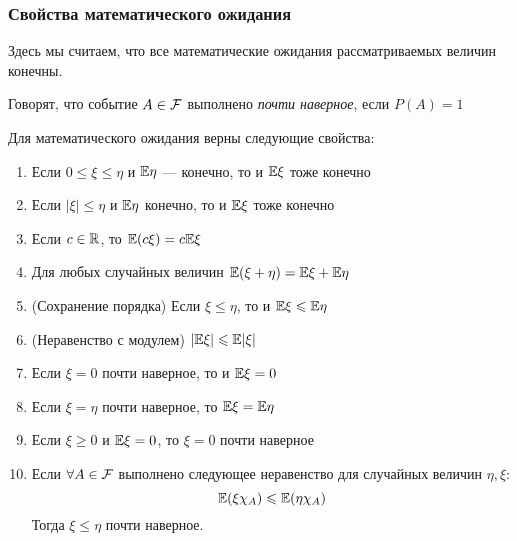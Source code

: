 \subsubsection*{Свойства математического ожидания}

\begin{note}
	Здесь мы считаем, что все математические ожидания рассматриваемых величин конечны.
\end{note}

\begin{definition}
	Говорят, что событие $A \in \mathcal{F}$ выполнено \textit{почти наверное}, если $P(A) = 1$
\end{definition}

\begin{proposition}
	Для математического ожидания верны следующие свойства:
	\begin{enumerate}
		\item Если $0 \le \xi \le \eta$ и $\mathbb{E}\eta$ --- конечно, то и $\mathbb{E}\xi$ тоже конечно
		
		\item Если $|\xi| \le \eta$ и $\mathbb{E}\eta$ конечно, то и $\mathbb{E}\xi$ тоже конечно
		
		\item Если $c \in \mathbb{R}$, то $\mathbb{E}(c\xi) = c\mathbb{E}\xi$
		
		\item Для любых случайных величин $\mathbb{E}(\xi + \eta) = \mathbb{E}\xi + \mathbb{E}\eta$
		
		\item (Сохранение порядка) Если $\xi \le \eta$, то и $\mathbb{E}\xi \leqslant \mathbb{E}\eta$
		
		\item (Неравенство с модулем) $|\mathbb{E}\xi| \leqslant \mathbb{E}|\xi|$
		
		\item Если $\xi = 0$ почти наверное, то и $\mathbb{E}\xi = 0$
		
		\item Если $\xi = \eta$ почти наверное, то $\mathbb{E}\xi = \mathbb{E}\eta$
		
		\item Если $\xi \ge 0$ и $\mathbb{E}\xi = 0$, то $\xi = 0$ почти наверное
		
		\item Если $\forall A \in \mathcal{F}$ выполнено следующее неравенство для случайных величин $\eta, \xi$:
		\[
			\mathbb{E}(\xi\chi_A) \leqslant \mathbb{E}(\eta\chi_A)
		\]
		Тогда $\xi \le \eta$ почти наверное.
	\end{enumerate}
\end{proposition}

